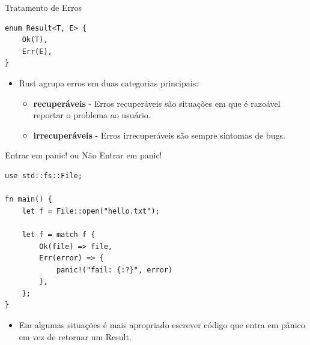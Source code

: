 \begin{frame}[fragile]{Tratamento de Erros}
\lstset{language=Rust, style=boxed}
\begin{lstlisting}
enum Result<T, E> {
    Ok(T),
    Err(E),
}
\end{lstlisting}

\begin{itemize}
    \item Rust agrupa erros em duas categorias principais:
\begin{itemize}
    \item \textbf{recuperáveis} - Erros recuperáveis são situações em que é razoável reportar o problema ao usuário.
    \item \textbf{irrecuperáveis} - Erros irrecuperáveis são sempre sintomas de bugs.
\end{itemize}
\end{itemize}

\end{frame}

\begin{frame}[fragile]{Entrar em panic! ou Não Entrar em panic!}
\lstset{language=Rust, style=boxed}
\begin{lstlisting}
use std::fs::File;

fn main() {
    let f = File::open("hello.txt");

    let f = match f {
        Ok(file) => file,
        Err(error) => {
            panic!("fail: {:?}", error)
        },
    };
}
\end{lstlisting}
\begin{itemize}
    \item Em algumas situações é mais apropriado escrever código que entra em pânico em vez de retornar um Result.
\end{itemize}

\end{frame}
